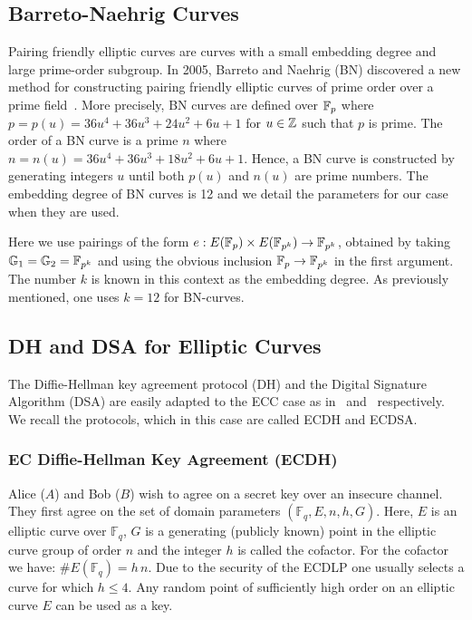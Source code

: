 \subsection{Barreto-Naehrig Curves}

Pairing friendly elliptic curves are curves with a small embedding degree and
large prime-order subgroup. In 2005, Barreto and Naehrig (BN) discovered a new
method for constructing pairing friendly elliptic curves of prime order over a
prime field~\cite{BN06}. More precisely, BN curves are defined over $\mathbb{F}_{p}$
where $p = p(u) = 36 u^4 + 36 u^3 + 24 u^2 + 6 u + 1$ for $u \in \mathbb{Z}$ such that
$p$ is prime. The order of a BN curve is a prime $n$ where
$n = n(u) = 36 u^4 + 36 u^3 + 18 u^2 + 6 u + 1$. Hence, a BN curve is
constructed by generating integers $u$ until both $p(u)$ and $n(u)$ are prime
numbers. The embedding degree of BN curves is 12 and we detail the parameters
for our case when they are used.

Here we use pairings of the form $e: E(\mathbb{F}_{p}) \times E(\mathbb{F}_{p^k}) \to \mathbb{F}_{p^k}$,
obtained by taking $\mathbb{G}_{1} = \mathbb{G}_{2} = \mathbb{F}_{p^k}$ and using the obvious inclusion
$\mathbb{F}_{p} \to \mathbb{F}_{p^k}$ in the first argument. The number $k$ is known in this
context as the embedding degree. As previously mentioned, one uses $k = 12$ for
BN-curves.

\subsection{DH and DSA for Elliptic Curves}\label{sec:dhdsa}

The Diffie-Hellman key agreement protocol (DH) and the Digital Signature
Algorithm (DSA) are easily adapted to the ECC case as in~\cite{BSS05}
and~\cite{JM00} respectively. We recall the protocols, which in this case are
called ECDH and ECDSA.

\subsubsection{EC Diffie-Hellman Key Agreement (ECDH)}

Alice ($A$) and Bob ($B$) wish to agree on a
secret key over an insecure channel. They first agree on the set
of domain parameters $(\mathbb{F}_q, E, n,
h, G)$. Here, $E$ is an elliptic curve over
$\mathbb{F}_q$, $G$ is a generating (publicly known) point in
the elliptic curve group of order $n$ and the integer
$h$ is called the cofactor. For the cofactor we have:
$\# E(\mathbb{F}_q) = h \, n.$
Due to the security of the ECDLP one usually
selects a curve for which $h \leq 4$.
Any random point of sufficiently high order on
an elliptic curve $E$ can be used as a key.

